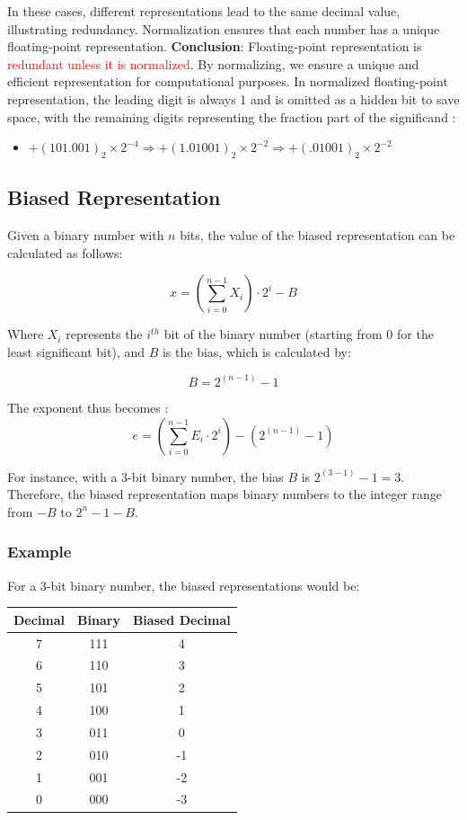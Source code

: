 \documentclass[12pt,openany, tikz,border=10pt]{book}
\begin{document}
    
    In these cases, different representations lead to the same decimal value, illustrating redundancy. Normalization ensures that each number has a unique floating-point representation. 
    \vskip 0.5cm
    \textbf{Conclusion}: Floating-point representation is \textcolor{red}{redundant unless it is normalized}. By normalizing, we ensure a unique and efficient representation for computational purposes.
\vskip 0.5cm
    In normalized floating-point representation, the leading digit is always 1 and is omitted as a hidden bit to save space, with the remaining digits representing the fraction part of the significand :
    \begin{itemize}
        \item[] \( +(101.001)_2 \times 2^{-4} \Rightarrow +(1.01001)_2 \times 2^{-2} \Rightarrow +(.01001)_2 \times 2^{-2} \)
    \end{itemize}




\newpage
\subsection{Biased Representation}

Given a binary number with $n$ bits, the value of the biased representation can be calculated as follows:

\[
x = (\sum_{i=0}^{n-1} X_i) \cdot 2^i - B
\]

Where $X_i$ represents the $i^{th}$ bit of the binary number (starting from 0 for the least significant bit), and $B$ is the bias, which is calculated by:

\[
B = 2^{(n-1)} - 1
\]


The exponent thus becomes : 
\[ e = (\sum_{i=0}^{n-1} E_i \cdot 2^i) - (2^{(n-1)} - 1) \]

For instance, with a 3-bit binary number, the bias $B$ is $2^{(3-1)} - 1 = 3$. Therefore, the biased representation maps binary numbers to the integer range from $-B$ to $2^n - 1 - B$.

\subsubsection{Example}

For a 3-bit binary number, the biased representations would be:

\begin{center}
\begin{tabular}{ccc}
\textbf{Decimal} & \textbf{Binary} & \textbf{Biased Decimal} \\
\hline
7 & 111 & 4 \\
6 & 110 & 3 \\
5 & 101 & 2 \\
4 & 100 & 1 \\
3 & 011 & 0 \\
2 & 010 & -1 \\
1 & 001 & -2 \\
0 & 000 & -3 \\
\end{tabular}
\end{center}
\end{document}
